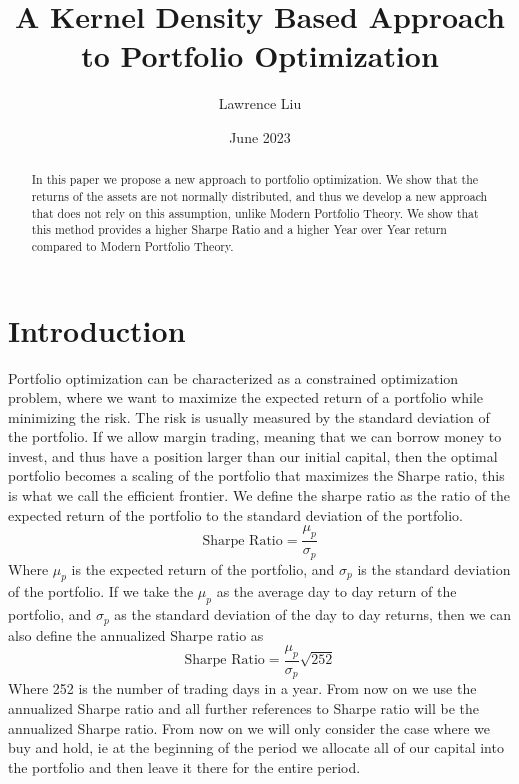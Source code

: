 \documentclass[10pt]{article}
\title{A Kernel Density Based Approach to Portfolio Optimization}
\author{Lawrence Liu}
\date{June 2023}
\begin{document}
\maketitle
\begin{abstract}
    In this paper we propose a new approach to portfolio optimization. 
    We show that the returns of the assets are not normally distributed, and thus we develop a new approach 
    that does not rely on this assumption, unlike Modern Portfolio Theory. We show that this method 
    provides a higher Sharpe Ratio and a higher Year over Year return compared to Modern Portfolio Theory.
\end{abstract}
\section{Introduction}
Portfolio optimization can be characterized as a constrained optimization problem, where we want to maximize the expected return 
of a portfolio while minimizing the risk. The risk is usually measured by the standard deviation of the portfolio. If we allow margin trading,
meaning that we can borrow money to invest, and thus have a position larger than our initial capital, then the optimal 
portfolio becomes a scaling of the portfolio that maximizes the Sharpe ratio, this is what we call the efficient frontier. We define the 
sharpe ratio as the ratio of the expected return of the portfolio to the standard deviation of the portfolio.
\begin{equation}
    \text{Sharpe Ratio} = \frac{\mu_p}{\sigma_p}
\end{equation}
Where $\mu_p$ is the expected return of the portfolio, and $\sigma_p$ is the standard deviation of the portfolio. If we take the $\mu_p$
as the average day to day return of the portfolio, and $\sigma_p$ as the standard deviation of the day to day returns, then we can 
also define the annualized Sharpe ratio as
\begin{equation}
    \text{Sharpe Ratio} = \frac{\mu_p}{\sigma_p}\sqrt{252}
\end{equation}
Where 252 is the number of trading days in a year. From now on we use the annualized Sharpe ratio and all further references 
to Sharpe ratio will be the annualized Sharpe ratio. From now on we will only consider the case where we 
buy and hold, ie at the beginning of the period we allocate all of our capital into the portfolio and then leave it there for the entire period.
\end{document}
